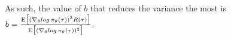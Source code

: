 \documentclass[11pt,english]{article}
\begin{document}
\begin{enumerate}
	As such, the value of $b$ that reduces the variance the most is $b = \frac{\mathrm{E}\big[(\nabla_\theta log\thinspace \pi_\theta (\tau))^2R(\tau)\big]}{\mathrm{E}\big[(\nabla_\theta log\thinspace \pi_\theta (\tau))^2\big]}$.\pagebreak
\end{enumerate}
\end{document}
